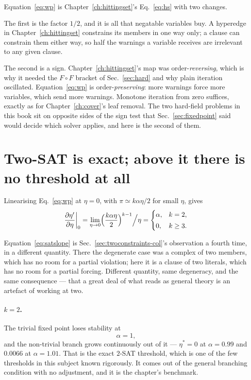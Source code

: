 Equation~\eqref{eq:wp} is Chapter~\ref{ch:hittingset}'s
Eq.~\eqref{eq:hs} with two changes.

The first is the factor $1/2$, and it is all that negatable variables buy. A hyperedge in Chapter~\ref{ch:hittingset} constrains its members in one
way only; a clause can constrain them either way, so half the warnings a
variable receives are irrelevant to any given clause.

The second is a sign. Chapter~\ref{ch:hittingset}'s map was
order-\emph{reversing}, which is why it needed the $F\circ F$ bracket of
Sec.~\ref{sec:hard} and why plain iteration oscillated. Equation~\eqref{eq:wp}
is order-\emph{preserving}: more warnings force more variables, which send more
warnings. Monotone iteration from zero suffices, exactly as for
Chapter~\ref{ch:cover}'s leaf removal. The two hard-field problems in this book
sit on opposite sides of the sign test that Sec.~\ref{sec:fixedpoint} said would
decide which solver applies, and here is the second of them.

\section{Two-SAT is exact; above it there is no threshold at all}
\label{sec:twosat}

Linearising Eq.~\eqref{eq:wp} at $\eta=0$, with $\pi\simeq k\alpha\eta/2$ for
small $\eta$, gives
\begin{equation}
  \frac{\partial\eta'}{\partial\eta}\bigg|_{0}
    =\lim_{\eta\to0}\Bigl(\frac{k\alpha\eta}{2}\Bigr)^{k-1}\Big/\eta
    =\begin{cases}
       \alpha, & k=2,\\[2pt]
       0, & k\ge3.
     \end{cases}
  \label{eq:satslope}
\end{equation}

Equation~\eqref{eq:satslope} is Sec.~\ref{sec:twoconstraints-col}'s
observation a fourth time, in a different quantity. There the degenerate case was a complex of two
members, which has no room for a partial violation; here it is a clause of two
literals, which has no room for a partial forcing. Different quantity, same
degeneracy, and the same consequence --- that a great deal of what reads as
general theory is an artefact of working at two.

\paragraph{$k=2$.} The trivial fixed point loses stability at
\begin{equation}
  \alpha=1,
\end{equation}
and the non-trivial branch grows continuously out of it --- $\eta^{*}=0$ at
$\alpha=0.99$ and $0.0066$ at $\alpha=1.01$. That is the exact $2$-SAT
threshold, which is one of the few thresholds in this subject known rigorously.
It comes out of the general branching condition with no adjustment, and it is
the chapter's benchmark.

